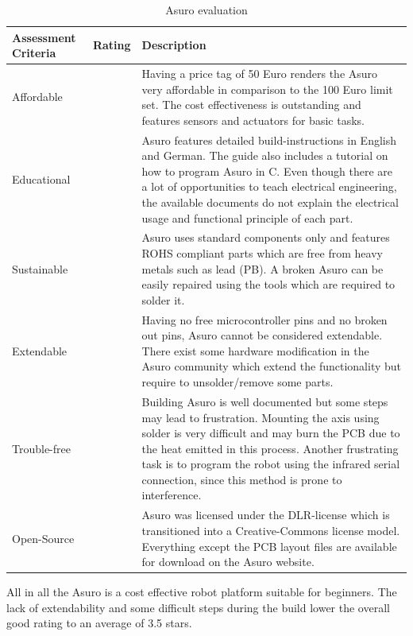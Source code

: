 \documentclass[11pt,a4paper]{article}
\newcounter{starnumber}
\newcommand{\stars}[1]{
  \forloop{starnumber}{1}{\value{starnumber} < 6}{
    \ifthenelse{#1 < \value{starnumber}}{\ding{73}}{\ding{72}}%
  }
}
\begin{document}
\begin{table}[h!]
\centering
\begin{tabular}{p{}p{}p{}}
\toprule
Assessment Criteria    & Rating & Description \\
\midrule
Affordable      & \stars{5}    & Having a price tag of 50 Euro renders the Asuro very affordable in comparison to the 100 Euro limit set. The cost effectiveness is outstanding and features sensors and actuators for basic tasks.     \\
Educational     & \stars{3}     & Asuro features detailed build-instructions in English and German. The guide also includes a tutorial on how to program Asuro in C. Even though there are a lot of opportunities to teach electrical engineering, the available documents do not explain the electrical usage and functional principle of each part. \\
Sustainable       & \stars{4}     & Asuro uses standard components only and features ROHS compliant parts which are free from heavy metals such as lead (PB). A broken Asuro can be easily repaired using the tools which are required to solder it. \\
Extendable & \stars{2}      & Having no free microcontroller pins and no broken out pins, Asuro cannot be considered extendable. There exist some hardware modification in the Asuro community which extend the functionality but require to unsolder/remove some parts.  \\
Trouble-free & \stars{3} & Building Asuro is well documented but some steps may lead to frustration. Mounting the axis using solder is very difficult and may burn the PCB due to the heat emitted in this process. Another frustrating task is to program the robot using the infrared serial connection, since this method is prone to interference. \\
Open-Source & \stars{4} & Asuro was licensed under the DLR-license which is transitioned into a Creative-Commons license model. Everything except the PCB layout files are available for download on the Asuro website.\\
\bottomrule
\end{tabular}
\caption{Asuro evaluation}
\label{tbl:asuro_eval}
\end{table}

All in all the Asuro is a cost effective robot platform suitable for beginners. The lack of extendability and some difficult steps during the build lower the overall good rating to an average of 3.5 stars. 
\end{document}
